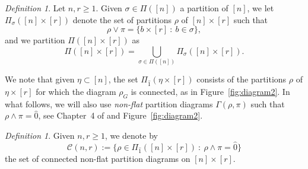 \documentclass[bj,authoryear,noshowframe]{imsart}
\theoremstyle{plain}
\theoremstyle{remark}
\newtheorem{definition}[theorem]{Definition}
\begin{document}
 \vspace{-1cm}
   
 \begin{definition}
  Let $n , r \geq 1$. 
  Given $\sigma \in \Pi ([n] )$ a partition of $[n]$, 
  we let $\Pi_\sigma ( [n] \times [r])$ denote the set of
  partitions $\rho$ of $[n] \times [r]$ such that
  $$
  \rho\vee\pi= \{ b \times [r] \ : \ b \in \sigma \}, 
  $$
  and %
  we partition $\Pi ([n] \times [r])$ as
 \begin{equation}
 \label{partition} 
  \Pi ([n] \times [r])
  = \bigcup_{\sigma \in \Pi ([n] )} \Pi_\sigma ([n] \times [r]). 
 \end{equation} 
 \end{definition}
 
 \vspace{-0.4cm}
 
 \noindent
  We note that given $\eta \subset [n]$,
 the set $\Pi_{\widehat{1}} ( \eta \times [r])$ consists of the partitions
 $\rho$ of $\eta \times [r]$ for which the diagram $\rho_G$
 is connected, as in Figure~\ref{fig:diagram2}. 
  In what follows, we will also use {\em non-flat} partition diagrams
  $\Gamma(\rho,\pi )$ such that $\rho \wedge \pi = \widehat{0}$,
  see Chapter~4 of \cite{peccatitaqqu} and Figure~\ref{fig:diagram2}. 
 
 \vspace{-0.2cm}
 
 \begin{definition} 
   \noindent
  Given $n,r\geq 1$, we denote by 
  $$
  \mathcal{C} (n,r) :=\{\rho\in\Pi_{\widehat{1}} ([n]\times[r]) \ : \ \rho\wedge \pi=\widehat{0} \}
   $$
  the set of connected non-flat partition diagrams on $[n]\times[r]$. 
 \end{definition}
 
 
 \vspace{-0.4cm}
 
\end{document}
